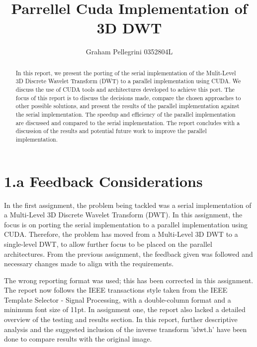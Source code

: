 \documentclass[journal,11pt]{IEEEtran}
\begin{document}
\title{Parrellel Cuda Implementation of 3D DWT}
\author{Graham Pellegrini 0352804L}


\maketitle

\begin{abstract}
In this report, we present the porting of the serial implementation of the Mulit-Level 3D Discrete Wavelet Transform (DWT) to a parallel implementation using CUDA. We discuss the use of CUDA tools and architectures developed to achieve this port. The focus of this report is to discuss the decisions made, compare the chosen approaches to other possible solutions, and present the results of the parallel implementation against the serial implementation. The speedup and efficiency of the parallel implementation are discussed and compared to the serial implementation. The report concludes with a discussion of the results and potential future work to improve the parallel implementation.
\end{abstract}

\section{1.a Feedback Considerations}

In the first assignment, the problem being tackled was a serial implementation of a Multi-Level 3D Discrete Wavelet Transform (DWT). In this assignment, the focus is on porting the serial implementation to a parallel implementation using CUDA. Therefore, the problem has moved from a Multi-Level 3D DWT to a single-level DWT, to allow further focus to be placed on the parallel architectures. From the previous assignment, the feedback given was followed and necessary changes made to align with the requirements.

The wrong reporting format was used; this has been corrected in this assignment. The report now follows the IEEE transactions style taken from the IEEE Template Selector - Signal Processing, with a double-column format and a minimum font size of 11pt. In assignment one, the report also lacked a detailed overview of the testing and results section. In this report, further descriptive analysis and the suggested inclusion of the inverse transform 'idwt.h' have been done to compare results with the original image.
\end{document}
